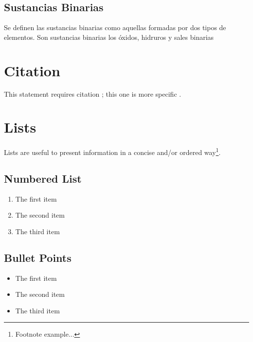 \documentclass[11pt,fleqn]{book} %
\begin{document}
\begin{description}
\section{Sustancias Binarias}
	Se definen las sustancias binarias como aquellas formadas por dos tipos de elementos. Son sustancias binarias los óxidos, hidruros y sales binarias
	
	
\end{description}


\section{Citation}

This statement requires citation \cite{book_key}; this one is more specific \cite[122]{article_key}.


\section{Lists}

Lists are useful to present information in a concise and/or ordered way\footnote{Footnote example...}.

\subsection{Numbered List}

\begin{enumerate}
\item The first item
\item The second item
\item The third item
\end{enumerate}

\subsection{Bullet Points}

\begin{itemize}
\item The first item
\item The second item
\item The third item
\end{itemize}
\end{document}
